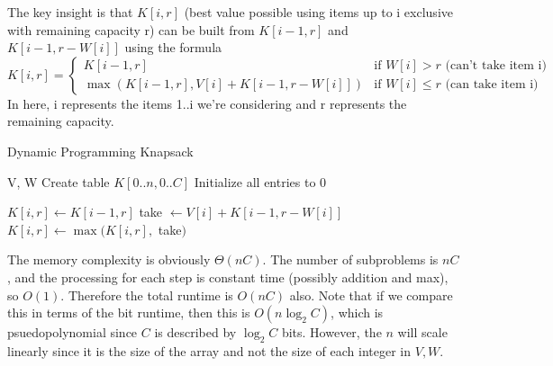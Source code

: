   \begin{algo}
    The key insight is that $K[i,r]$ (best value possible using items up to i exclusive with remaining capacity r) can be built from $K[i-1,r]$ and $K[i-1,r-W[i]]$ using the formula 
    \begin{equation}
      K[i,r] = \begin{cases}
        K[i-1,r] & \text{if } W[i] > r \text{ (can't take item i)} \\
        \max(K[i-1,r], V[i] + K[i-1,r-W[i]]) & \text{if } W[i] \leq r \text{ (can take item i)}
      \end{cases}        
    \end{equation}
    In here, i represents the items 1..i we're considering and r represents the remaining capacity.
    \begin{algorithm}[H]
      \caption{Dynamic Programming Knapsack}
      \label{alg:dpknap}
      \begin{algorithmic}
        \State V, W
          \State Create table $K[0..n, 0..C]$ 
          \State Initialize all entries to 0
          
            
              
              \State $K[i,r] \gets K[i-1,r]$  
                
                \State take $\gets V[i] + K[i-1,r-W[i]]$  
                \State $K[i,r] \gets \max(K[i,r],$ take$)$  
              \EndIf
            \EndFor
          \EndFor
          
          \State {}  
        \EndFunction
      \end{algorithmic}
    \end{algorithm}
    The memory complexity is obviously $\Theta(n C)$. The number of subproblems is $nC$, and the processing for each step is constant time (possibly addition and max), so $O(1)$. Therefore the total runtime is $O(nC)$ also. Note that if we compare this in terms of the bit runtime, then this is $O(n \log_2 C)$, which is psuedopolynomial since $C$ is described by $\log_2 {C}$ bits. However, the $n$ will scale linearly since it is the size of the array and not the size of each integer in $V, W$. 
  \end{algo}

